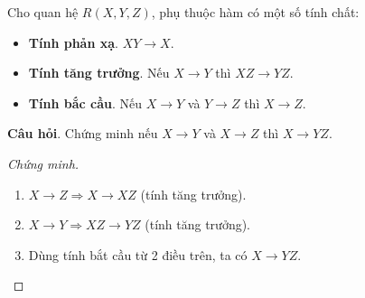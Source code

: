 \documentclass[11pt]{beamer}
\newcommand{\fd}[2]{#1 \rightarrow #2}%
\begin{document}
\begin{frame}
  Cho quan hệ $R(X, Y, Z)$, phụ thuộc hàm có một số tính chất:
  \begin{itemize}
    \item \textbf{Tính phản xạ}. $\fd{XY}{X}$.
    \item \textbf{Tính tăng trưởng}. Nếu $\fd{X}{Y}$ thì $\fd{XZ}{YZ}$.
    \item \textbf{Tính bắc cầu}. Nếu $\fd{X}{Y}$ và $\fd{Y}{Z}$ thì $\fd{X}{Z}$.
  \end{itemize}
  \textbf{Câu hỏi}. Chứng minh nếu $\fd{X}{Y}$ và $\fd{X}{Z}$ thì $\fd{X}{YZ}$.
\end{frame}

\begin{frame}
  \begin{proof}[Chứng minh]
    \begin{enumerate}
      \item<1-> $\fd{X}{Z} \Rightarrow \fd{X}{XZ}$ (tính tăng trưởng).
      \item<2-> $\fd{X}{Y} \Rightarrow \fd{XZ}{YZ}$ (tính tăng trưởng).
      \item<3-> Dùng tính bắt cầu từ 2 điều trên, ta có $\fd{X}{YZ}$.
    \end{enumerate}
  \end{proof}
\end{frame}
\end{document}
